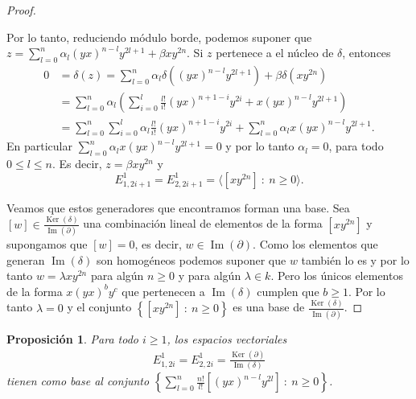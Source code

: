 \documentclass[a4paper,oneside,fleqn,11pt]{article}
\newtheorem{prop}{Proposición}
\numberwithin{prop}{subsection}
\DeclareMathOperator\Ima{Im}
\DeclareMathOperator\Ker{Ker}
\begin{document}
\begin{proof}
\begin{itemize}
		Por lo tanto, reduciendo módulo borde, podemos suponer que $z = \sum_{l = 0}^n\alpha_l(yx)^{n - l}y^{2l + 1} + \beta xy^{2n}$.
		Si $z$ pertenece a el núcleo de $\delta$, entonces
		\begin{align*}
			0 &= \delta(z) = \sum_{l = 0}^n\alpha_l\delta((yx)^{n - l}y^{2l + 1}) + \beta \delta(xy^{2n}) \\
			&= \sum_{l = 0}^n\alpha_l \left( \sum_{i = 0}^l\frac{l!}{i!}(yx)^{n + 1 - i}y^{2i} + x(yx)^{n - l}y^{2l + 1} \right) \\
			&= \sum_{l = 0}^n \sum_{i = 0}^l\alpha_l\frac{l!}{i!}(yx)^{n + 1 - i}y^{2i}
				+ \sum_{l = 0}^n\alpha_l x(yx)^{n - l}y^{2l + 1}.
		\end{align*}	
		En particular $\sum_{l = 0}^n\alpha_l x(yx)^{n - l}y^{2l + 1}  = 0$ y por lo tanto $\alpha_l = 0$, para todo $0 \leq l \leq n$.
		Es decir, $z = \beta xy^{2n}$ y
		\[
			E_{1,2i + 1}^1 = E_{2, 2i + 1}^1 = \langle \left[xy^{2n}\right]\ :\ n \geq 0 \rangle.
		\]
	\end{itemize}
		Veamos que estos generadores que encontramos forman una base. Sea $[w] \in \frac{\Ker(\delta)}{\Ima(\partial)}$ una combinación
		lineal de elementos de la forma $[xy^{2n}]$ y supongamos que $[w] = 0$, es decir, $w \in \Ima(\partial)$.
		Como los elementos que generan $\Ima(\delta)$ son homogéneos podemos suponer que $w$ también lo es y por lo tanto $w = \lambda xy^{2n}$
		para algún $n \geq 0$ y para algún $\lambda \in k$.
		Pero los únicos elementos de la forma $x(yx)^by^c$ que pertenecen a $\Ima(\delta)$ cumplen que $b \geq 1$.
		Por lo tanto $\lambda = 0$ y el conjunto $\left\{ [xy^{2n}] \ :\ n \geq 0\right\}$ es una base de $\frac{\Ker(\delta)}{\Ima(\partial)}$.	 
\end{proof}
\begin{prop}
	Para todo $i \geq 1$, los espacios vectoriales
	\begin{align*}
		E_{1,2i}^1 = E_{2, 2i}^1 = \frac{\Ker(\partial)}{\Ima(\delta)}
	\end{align*}
	tienen como base al conjunto $\left\{ \sum_{l = 0}^n \frac{n!}{l!}\left[(yx)^{n - l}y^{2l}\right] \ :\ n \geq 0\right\}$.
\end{prop}
\end{document}
